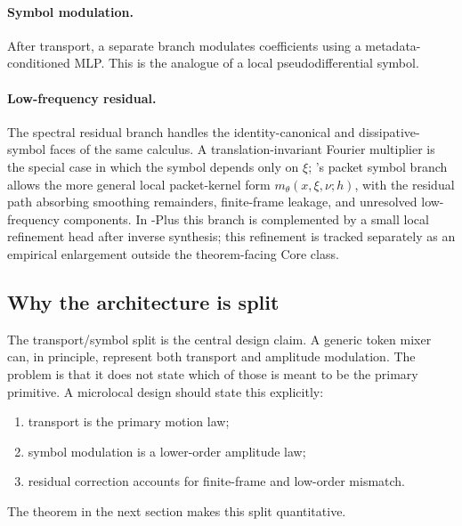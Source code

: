 \paragraph{Symbol modulation.}
After transport, a separate branch modulates coefficients using a metadata-conditioned MLP. This is the analogue of a local pseudodifferential symbol.

\paragraph{Low-frequency residual.}
The spectral residual branch handles the identity-canonical and dissipative-symbol faces of the same calculus. A translation-invariant Fourier multiplier is the special case in which the symbol depends only on $\xi$; \MiNO's packet symbol branch allows the more general local packet-kernel form $m_\theta(x,\xi,\nu;h)$, with the residual path absorbing smoothing remainders, finite-frame leakage, and unresolved low-frequency components. In \MiNO-Plus this branch is complemented by a small local refinement head after inverse synthesis; this refinement is tracked separately as an empirical enlargement outside the theorem-facing Core class.

\subsection{Why the architecture is split}

The transport/symbol split is the central design claim. A generic token mixer can, in principle, represent both transport and amplitude modulation. The problem is that it does not state which of those is meant to be the primary primitive. A microlocal design should state this explicitly:
\begin{enumerate}
\item transport is the primary motion law;
\item symbol modulation is a lower-order amplitude law;
\item residual correction accounts for finite-frame and low-order mismatch.
\end{enumerate}
The theorem in the next section makes this split quantitative.

